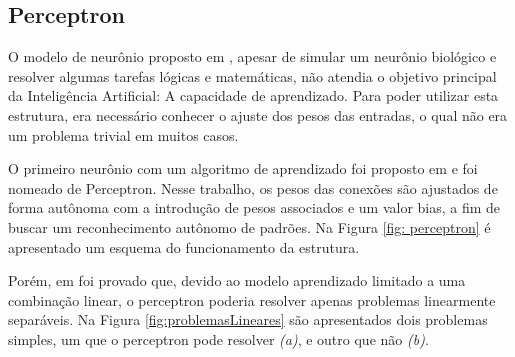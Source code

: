         \subsection{Perceptron} \label{sec: perceptron}
    
            O modelo de neurônio proposto em , apesar de simular um neurônio biológico e resolver algumas tarefas lógicas e matemáticas, não atendia o objetivo principal da Inteligência Artificial: A capacidade de aprendizado. Para poder utilizar esta estrutura, era necessário conhecer o ajuste dos pesos das entradas, o qual não era um problema trivial em muitos casos. 
                        
            O primeiro neurônio com um algoritmo de aprendizado foi proposto em  e foi nomeado de Perceptron. Nesse trabalho, os pesos das conexões são ajustados de forma autônoma com a introdução de pesos associados e um valor bias, a fim de buscar um reconhecimento autônomo de padrões. Na Figura \ref{fig: perceptron} é apresentado um esquema do funcionamento da estrutura.
            
            \begin{figure}[ht]
            \end{figure}
            
            Porém, em  foi provado que, devido ao modelo aprendizado limitado a uma combinação linear, o perceptron poderia resolver apenas problemas linearmente separáveis. Na Figura \ref{fig:problemasLineares} são apresentados dois problemas simples, um que o perceptron pode resolver \textit{(a)}, e outro que não \textit{(b)}.
            
